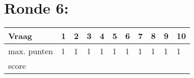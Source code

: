 



\begin{center}
\end{center}
\vspace{5mm}
 
 
\vspace{5mm}
 
\section{Ronde 6:}
\begin{questions}

\end{questions}
\begin{table}[!b]
\centering
\begin{tabular}{|l|l|l|l|l|l|l|l|l|l|l|}
\hline
Vraag       & 1 & 2 & 3 & 4 & 5 & 6 & 7 & 8 & 9 & 10 \\ \hline
max. punten & 1 & 1 & 1 & 1 & 1 & 1 & 1 & 1 & 1 & 1  \\ \hline
score       &   &   &   &   &   &   &   &   &   &    \\ \hline
\end{tabular}
\end{table}
\newpage
